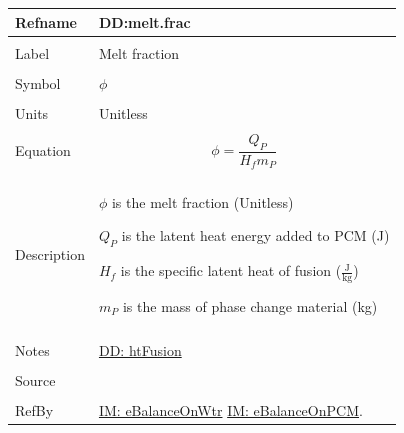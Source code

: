 \documentclass[12pt]{article}
\begin{document}
\noindent \begin{minipage}{\textwidth}
\begin{tabular}{p{} p{}}
\toprule \textbf{Refname} & \textbf{DD:melt.frac}
\label{DD:melt.frac}
\\ \midrule \\
Label & Melt fraction
\\ \midrule \\
Symbol & $ϕ$
\\ \midrule \\
Units & Unitless
\\ \midrule \\
Equation & \begin{displaymath}
           ϕ=\frac{{Q_{P}}}{{H_{f}} {m_{P}}}
           \end{displaymath}
\\ \midrule \\
Description & \begin{symbDescription}
              \item{$ϕ$ is the melt fraction (Unitless)}
              \item{${Q_{P}}$ is the latent heat energy added to PCM (J)}
              \item{${H_{f}}$ is the specific latent heat of fusion ($\frac{\text{J}}{\text{kg}}$)}
              \item{${m_{P}}$ is the mass of phase change material (kg)}
              \end{symbDescription}
\\ \midrule \\
Notes & \hyperref[DD:htFusion]{DD: htFusion}
\\ \midrule \\
Source & \cite{koothoor2013}
\\ \midrule \\
RefBy & \hyperref[IM:eBalanceOnWtr]{IM: eBalanceOnWtr} \hyperref[IM:eBalanceOnPCM]{IM: eBalanceOnPCM}.
\\ \bottomrule \end{tabular}
\end{minipage}
\end{document}
